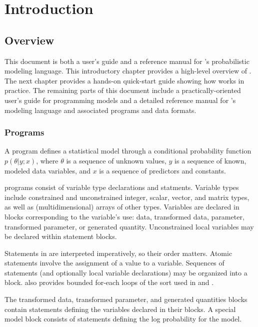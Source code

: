 \part{Introduction}


\chapter{Overview}

This document is both a user's guide and a reference manual for
\Stan's probabilistic modeling language.  This introductory chapter
provides a high-level overview of \Stan.  The next chapter provides a
hands-on quick-start guide showing how \Stan works in practice.  The
remaining parts of this document include a practically-oriented user's
guide for programming models and a detailed reference manual for
\Stan's modeling language and associated programs and data formats.

\section{\Stan Programs}

A \Stan program defines a statistical model through a conditional
probability function $p(\theta|y;x)$, where $\theta$ is a sequence of
unknown values, $y$ is a sequence of known, modeled data variables,
and $x$ is a sequence of predictors and constants.

\Stan programs consist of variable type declarations and statments.
Variable types include constrained and unconstrained integer, scalar,
vector, and matrix types, as well as (multidimensional) arrays of
other types.  Variables are declared in blocks corresponding to the
variable's use: data, transformed data, parameter, transformed
parameter, or generated quantity.  Unconstrained local variables may
be declared within statement blocks.

Statements in \Stan are interpreted imperatively, so their order
matters.  Atomic statements involve the assignment of a value to a
variable.  Sequences of statements (and optionally local variable
declarations) may be organized into a block.  \Stan also provides bounded
for-each loops of the sort used in \R and \BUGS.

The transformed data, transformed parameter, and generated quantities
blocks contain statements defining the variables declared in their
blocks.  A special model block consists of statements defining the log
probability for the model.

